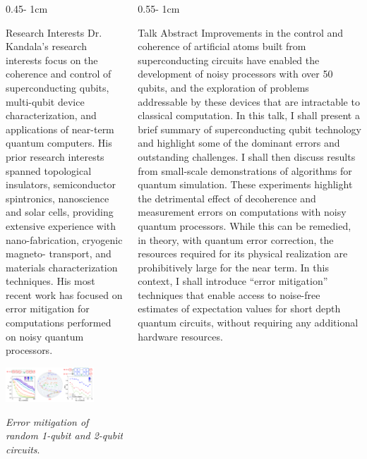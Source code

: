 \documentclass{../psuposter}
\begin{document}
\begin{frame}
\begin{columns}[t, totalwidth=\textwidth]
\begin{column}{0.45\textwidth - 1cm}
    \begin{block}{Research Interests}
        Dr. Kandala's research interests focus on the coherence and control of superconducting qubits, multi-qubit device characterization, and applications of near-term quantum computers. His prior research interests spanned topological insulators, semiconductor spintronics, nanoscience and solar cells, providing extensive experience with nano-fabrication, cryogenic magneto- transport, and materials characterization techniques. His most recent work has focused on error mitigation for computations performed on noisy quantum processors. \cite{kandalaErrorMitigationExtends2019}
        \begin{center}
	    	\includegraphics[width=0.75\textwidth]{images/error-mitigation}    		
    	\end{center}
    	\textit{Error mitigation of random 1-qubit and 2-qubit circuits}. \cite{kandalaErrorMitigationExtends2019}
    \end{block}
\end{column}
\begin{column}{0.55\textwidth - 1cm}


    \begin{block}{Talk Abstract}
        Improvements in the control and coherence of artificial atoms built from superconducting circuits have enabled the development of noisy processors with over 50 qubits, and the exploration of problems addressable by these devices that are intractable to classical computation. In this talk, I shall present a brief summary of superconducting qubit technology and highlight some of the dominant errors and outstanding challenges. I shall then discuss results from small-scale demonstrations of algorithms for quantum simulation. These experiments highlight the detrimental effect of decoherence and measurement errors on computations with noisy quantum processors. While this can be remedied, in theory, with quantum error correction, the resources required for its physical realization are prohibitively large for the near term. In this context, I shall introduce “error mitigation” techniques that enable access to noise-free estimates of expectation values for short depth quantum circuits, without requiring any additional hardware resources.  
    \end{block}



\end{column}
\end{columns}
\end{frame}
\end{document}
